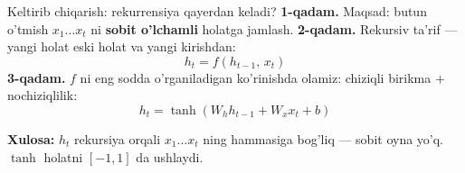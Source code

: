 \documentclass[aspectratio=169,11pt]{beamer}
\begin{document}
\begin{frame}{Keltirib chiqarish: rekurrensiya qayerdan keladi?}
  \textbf{1-qadam.} Maqsad: butun o'tmish $x_1\ldots x_t$ ni \textbf{sobit
  o'lchamli} holatga jamlash.
  \pause
  \textbf{2-qadam.} Rekursiv ta'rif --- yangi holat eski holat va yangi kirishdan:
  $$ h_t = f(h_{t-1},\, x_t) $$
  \pause
  \textbf{3-qadam.} $f$ ni eng sodda o'rganiladigan ko'rinishda olamiz: chiziqli
  birikma $+$ nochiziqlilik:
  $$ h_t = \tanh(W_h h_{t-1} + W_x x_t + b) $$
  \begin{tcolorbox}[okbox,top=2pt,bottom=2pt]
    \small \textbf{Xulosa:} $h_t$ rekursiya orqali $x_1\ldots x_t$ ning hammasiga
    bog'liq --- sobit oyna yo'q. $\tanh$ holatni $[-1,1]$ da ushlaydi.
  \end{tcolorbox}
\end{frame}
\end{document}

